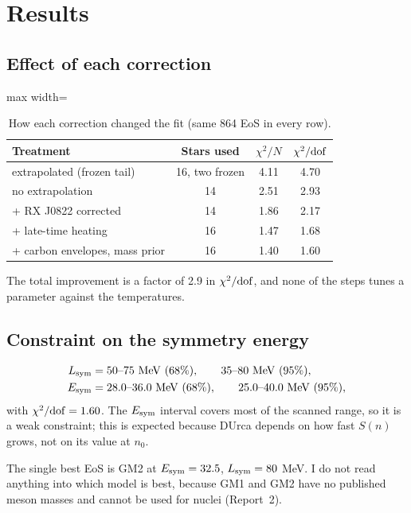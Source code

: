 \documentclass[11pt,a4paper]{article}
\newcommand{\Esym}{E_{\rm sym}}
\newcommand{\Lsym}{L_{\rm sym}}
\begin{document}
\section{Results}\label{sec:results}
\subsection{Effect of each correction}
\begin{table}[h]
\centering
\caption{How each correction changed the fit (same 864 EoS in every row).}\label{tab:progress}
\begin{adjustbox}{max width=\linewidth}
\begin{tabular}{lccc}
\toprule
Treatment & Stars used & $\chi^2/N$ & $\chi^2/{\rm dof}$\\
\midrule
extrapolated (frozen tail) & 16, two frozen & 4.11 & 4.70\\
no extrapolation & 14 & 2.51 & 2.93\\
+ RX J0822 corrected & 14 & 1.86 & 2.17\\
+ late-time heating & 16 & 1.47 & 1.68\\
+ carbon envelopes, mass prior & 16 & 1.40 & 1.60\\
\bottomrule
\end{tabular}
\end{adjustbox}
\end{table}
The total improvement is a factor of 2.9 in $\chi^2/{\rm dof}$, and none of the steps tunes a parameter against the temperatures.

\subsection{Constraint on the symmetry energy}
\begin{align}
\Lsym &= 50\text{--}75~{\rm MeV}~(68\%),\qquad 35\text{--}80~{\rm MeV}~(95\%),\\
\Esym &= 28.0\text{--}36.0~{\rm MeV}~(68\%),\qquad 25.0\text{--}40.0~{\rm MeV}~(95\%),
\end{align}
with $\chi^2/{\rm dof}=1.60$. The $\Esym$ interval covers most of the scanned range, so it is a weak constraint; this is expected because DUrca depends on how fast $S(n)$ grows, not on its value at $n_0$.

The single best EoS is GM2 at $\Esym=32.5$, $\Lsym=80$ MeV. I do not read anything into which model is best, because GM1 and GM2 have no published meson masses and cannot be used for nuclei (Report~2).
\end{document}
